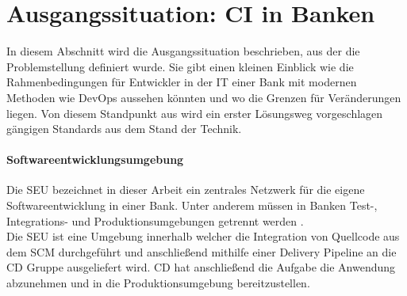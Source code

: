 \section{Ausgangssituation: CI in Banken}
\label{grundlagen:ci-in-banken}
In diesem Abschnitt wird die Ausgangssituation beschrieben, aus der die Problemstellung definiert wurde. Sie gibt einen kleinen Einblick wie die Rahmenbedingungen für Entwickler in der IT einer Bank mit modernen Methoden wie DevOps aussehen könnten und wo die Grenzen für Veränderungen liegen. Von diesem Standpunkt aus wird ein erster Lösungsweg vorgeschlagen gängigen Standards aus dem Stand der Technik. 
%
\paragraph{Softwareentwicklungsumgebung}
Die \ac{SEU} bezeichnet in dieser Arbeit ein zentrales Netzwerk für die eigene Softwareentwicklung in einer Bank. Unter anderem müssen in Banken Test-, Integrations- und Produktionsumgebungen getrennt werden \cite{MaRisk:2017}.
\medskip
\\
Die \ac{SEU} ist eine Umgebung innerhalb welcher die Integration von Quellcode aus dem \ac{SCM} durchgeführt und anschließend mithilfe einer Delivery Pipeline an die \ac{CD} Gruppe ausgeliefert wird. \ac{CD} hat anschließend die Aufgabe die Anwendung abzunehmen und in die Produktionsumgebung bereitzustellen.

